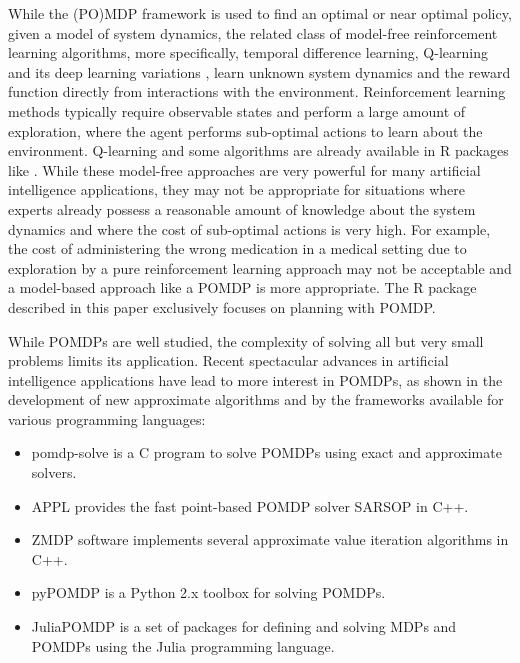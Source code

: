 While the (PO)MDP framework is used to find an optimal or near optimal policy, given
a model of system dynamics, the related class of model-free reinforcement learning algorithms, more specifically, temporal difference learning, Q-learning and its deep learning variations \citep{Sutton1998},
learn unknown system dynamics and
the reward function directly from interactions with the environment.
Reinforcement learning methods typically require observable states and perform a large amount of exploration, where the agent performs sub-optimal actions to learn about the environment.
Q-learning and some algorithms are already available in R packages like  \citep{Proellochs2020}.
While these model-free approaches are very powerful for many artificial intelligence applications, they may not be appropriate
for situations where experts already possess a reasonable
amount of knowledge about the system dynamics and where
the cost of sub-optimal actions is very high. For example, the cost of administering the wrong medication in a medical setting
due to exploration by a pure reinforcement learning approach may not be acceptable and a model-based approach like a POMDP is more appropriate.
The R package described in this paper exclusively focuses on planning with POMDP.

While POMDPs are well studied, the complexity of solving all but very small problems
limits its application.
Recent spectacular advances in artificial intelligence applications have lead to more interest in POMDPs, as
shown in the development of new approximate algorithms and
by the frameworks available for various programming languages:

\begin{itemize}
\tightlist
\item
  pomdp-solve \citep{Cassandra2015} is a C program to solve POMDPs using exact and approximate solvers.
\item
  APPL \citep{APPL2022} provides the fast point-based POMDP solver SARSOP in C++.
\item
  ZMDP software \citep{ZMDP2009} implements several approximate value iteration algorithms in C++.
\item
  pyPOMDP \citep{pypomdp2013} is a Python 2.x toolbox for solving POMDPs.
\item
  JuliaPOMDP \citep{juliapomdp2022} is a set of packages for defining and solving MDPs and POMDPs using the Julia programming language.
\end{itemize}

